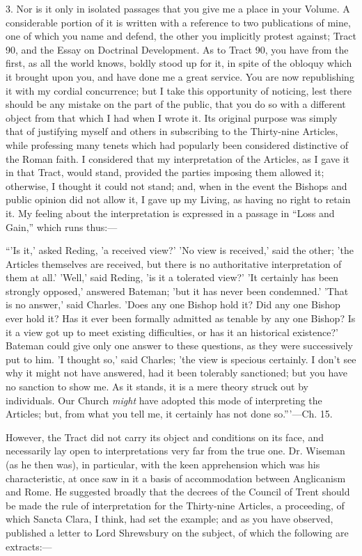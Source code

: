3. Nor is it only in isolated passages that you give me a place in
your Volume. A considerable portion of it is written with a reference to
two publications of mine, one of which you name and defend, the other
you implicitly protest against; Tract 90, and the Essay on Doctrinal
Development. As to Tract 90, you have from the first, as all the world
knows, boldly stood up for it, in spite of the obloquy which it brought
upon you, and have done me a great service. You are now republishing it
with my cordial concurrence; but I take this opportunity of noticing,
lest there should be any mistake on the part of the public, that you do
so with a different object from that which I had when I wrote it. Its
original purpose was simply that of justifying myself and others in
subscribing to the Thirty-nine Articles, while professing many tenets
which had popularly been considered distinctive of the Roman faith. I
considered that my interpretation of the Articles, as I gave it in that
Tract, would stand, provided the parties imposing them allowed it;
otherwise, I thought it could not stand; and, when in the event the
Bishops and public opinion did not allow it, I gave up my Living, as
having no right to retain it. My feeling about the interpretation is
expressed in a passage in ``Loss and Gain,'' which runs thus:—

``'Is it,' asked Reding, 'a received view?' 'No view is
received,' said the other; 'the Articles themselves are received,
but there is no authoritative interpretation of them at all.' 'Well,'
said Reding, 'is it a tolerated view?' 'It certainly has been strongly
opposed,' answered Bateman; 'but it has never been condemned.' 'That is
no answer,' said Charles. 'Does any one Bishop hold it? Did any one
Bishop ever hold it? Has it ever been formally admitted as tenable by
any one Bishop? Is it a view got up to meet existing difficulties, or
has it an historical existence?' Bateman could give only one answer to
these questions, as they were successively put to him. 'I thought so,'
said Charles; 'the view is specious certainly. I don't see why it might
not have answered, had it been tolerably sanctioned; but you have no
sanction to show me. As it stands, it is a mere theory struck out by
individuals. Our Church \emph{might} have adopted this mode of
interpreting the Articles; but, from what you tell me, it certainly has
not done so.'''—Ch. 15.

However, the Tract did not carry its object and conditions on its
face, and necessarily lay open to interpretations very far from the true
one. Dr. Wiseman (as he then was), in particular, with the keen
apprehension which was his characteristic, at once saw in it a basis of
accommodation between Anglicanism and Rome. He suggested broadly that
the decrees of the Council of Trent should be made the rule of
interpretation for the Thirty-nine Articles, a proceeding, of which
Sancta Clara, I think, had set the example; and as you have observed,
published a letter to Lord Shrewsbury on the subject, of which the
following are extracts:—

